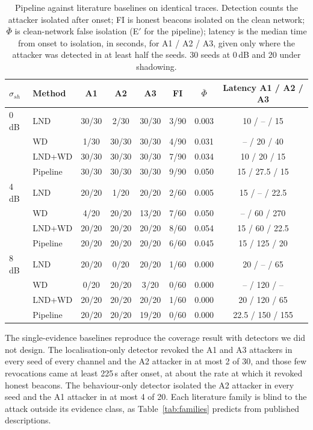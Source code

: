 \documentclass[pdflatex,sn-mathphys-num]{sn-jnl}%
\theoremstyle{thmstyleone}%
\theoremstyle{thmstyletwo}%
\theoremstyle{thmstylethree}%
\begin{document}
\begin{table}[!t]
\caption{Pipeline against literature baselines on identical traces. Detection
counts the attacker isolated after onset; FI is honest beacons isolated on the
clean network; $\bar\Phi$ is clean-network false isolation (E$'$ for the
pipeline); latency is the median time from onset to isolation, in seconds,
for A1 / A2 / A3, given only where the attacker was detected in at least half
the seeds. 30 seeds at 0\,dB and 20 under shadowing.}
\label{tab:baselines}
\centering
\footnotesize
\setlength{\tabcolsep}{3.5pt}
\begin{tabular}{@{}llcccccc@{}}
\toprule
$\sigma_{sh}$ & Method & A1 & A2 & A3 & FI & $\bar\Phi$ & Latency A1 / A2 / A3 \\
\midrule
0\,dB & LND & 30/30 & 2/30 & 30/30 & 3/90 & 0.003 & 10 / -- / 15 \\
      & WD & 1/30 & 30/30 & 30/30 & 4/90 & 0.031 & -- / 20 / 40 \\
      & LND+WD & 30/30 & 30/30 & 30/30 & 7/90 & 0.034 & 10 / 20 / 15 \\
      & Pipeline & 30/30 & 30/30 & 30/30 & 9/90 & 0.050 & 15 / 27.5 / 15 \\
4\,dB & LND & 20/20 & 1/20 & 20/20 & 2/60 & 0.005 & 15 / -- / 22.5 \\
      & WD & 4/20 & 20/20 & 13/20 & 7/60 & 0.050 & -- / 60 / 270 \\
      & LND+WD & 20/20 & 20/20 & 20/20 & 8/60 & 0.054 & 15 / 60 / 22.5 \\
      & Pipeline & 20/20 & 20/20 & 20/20 & 6/60 & 0.045 & 15 / 125 / 20 \\
8\,dB & LND & 20/20 & 0/20 & 20/20 & 1/60 & 0.000 & 20 / -- / 65 \\
      & WD & 0/20 & 20/20 & 3/20 & 0/60 & 0.000 & -- / 120 / -- \\
      & LND+WD & 20/20 & 20/20 & 20/20 & 1/60 & 0.000 & 20 / 120 / 65 \\
      & Pipeline & 20/20 & 20/20 & 19/20 & 0/60 & 0.000 & 22.5 / 150 / 155 \\
\bottomrule
\end{tabular}
\end{table}

The single-evidence baselines reproduce the coverage result with detectors
we did not design. The localisation-only detector revoked the A1 and A3
attackers in every seed of every channel and the A2 attacker in at most 2 of
30, and those few revocations came at least 225\,s after onset, at about the
rate at which it revoked honest beacons. The behaviour-only detector isolated
the A2 attacker in every seed and the A1 attacker in at most 4 of 20. Each
literature family is blind to the attack outside its evidence class, as
Table~\ref{tab:families} predicts from published descriptions.
\end{document}
